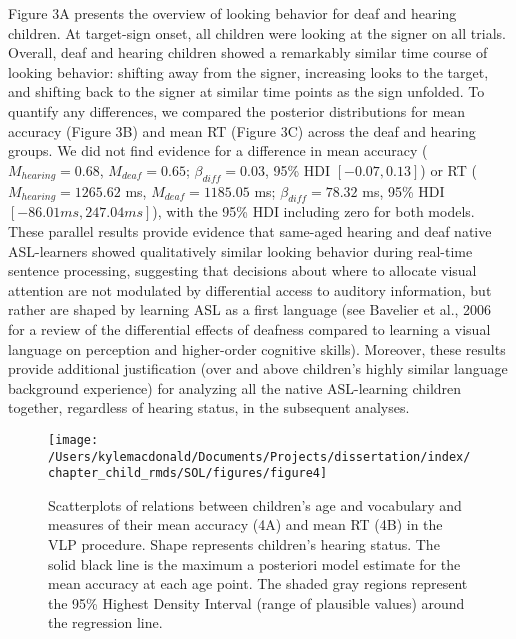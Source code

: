\documentclass[oneside]{report}
\begin{document}
Figure 3A presents the overview of looking behavior for deaf and hearing
children. At target-sign onset, all children were looking at the signer
on all trials. Overall, deaf and hearing children showed a remarkably
similar time course of looking behavior: shifting away from the signer,
increasing looks to the target, and shifting back to the signer at
similar time points as the sign unfolded. To quantify any differences,
we compared the posterior distributions for mean accuracy (Figure 3B)
and mean RT (Figure 3C) across the deaf and hearing groups. We did not
find evidence for a difference in mean accuracy (\(M_{hearing} = 0.68\),
\(M_{deaf} = 0.65\); \(\beta_{diff} = 0.03\), 95\% HDI
\([-0.07, 0.13]\)) or RT (\(M_{hearing} = 1265.62\) ms,
\(M_{deaf} = 1185.05\) ms; \(\beta_{diff} = 78.32\) ms, 95\% HDI
\([-86.01 ms, 247.04 ms]\)), with the 95\% HDI including zero for both
models. These parallel results provide evidence that same-aged hearing
and deaf native ASL-learners showed qualitatively similar looking
behavior during real-time sentence processing, suggesting that decisions
about where to allocate visual attention are not modulated by
differential access to auditory information, but rather are shaped by
learning ASL as a first language (see Bavelier et al., 2006 for a review
of the differential effects of deafness compared to learning a visual
language on perception and higher-order cognitive skills). Moreover,
these results provide additional justification (over and above
children's highly similar language background experience) for analyzing
all the native ASL-learning children together, regardless of hearing
status, in the subsequent analyses.
\begin{figure}[t]

{\centering \texttt{[image: /Users/kylemacdonald/Documents/Projects/dissertation/index/chapter\_child\_rmds/SOL/figures/figure4]} 

}

\caption[Scatterplots of relations between children's age and vocabulary and ASL processing]{Scatterplots of relations between children's age and vocabulary and measures of their mean accuracy (4A) and mean RT (4B) in the VLP procedure. Shape represents children's hearing status. The solid black line is the maximum a posteriori model estimate for the mean accuracy at each age point. The shaded gray regions represent the 95\% Highest Density Interval (range of plausible values) around the regression line.}\label{fig:sol-corr-figure}
\end{figure}
\end{document}
